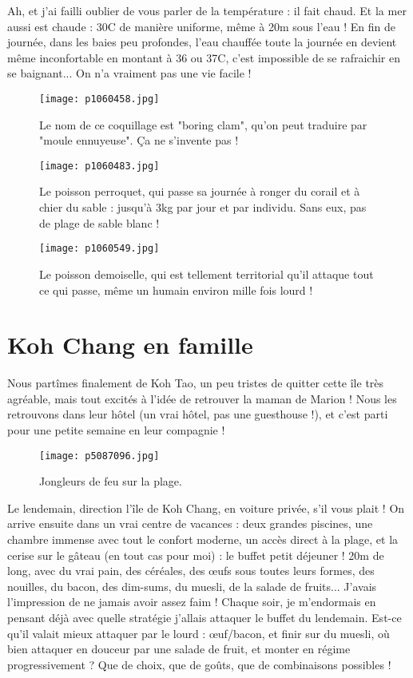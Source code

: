 \documentclass{book}
\begin{document}
Ah, et j'ai failli oublier de vous parler de la température : il fait chaud. Et la mer aussi est chaude : 30\textdegree C de manière uniforme, même à 20m sous l'eau ! En fin de journée, dans les baies peu profondes, l'eau chauffée toute la journée en devient même inconfortable en montant à 36 ou 37\textdegree C, c'est impossible de se rafraichir en se baignant... On n'a vraiment pas une vie facile !


\begin{figure}[h]
\centering
\texttt{[image: p1060458.jpg]}
\caption*{Le nom de ce coquillage est "boring clam", qu'on peut traduire par "moule ennuyeuse". Ça ne s'invente pas !}
\end{figure}


\begin{figure}[h]
\centering
\texttt{[image: p1060483.jpg]}
\caption*{Le poisson perroquet, qui passe sa journée à ronger du corail et à chier du sable : jusqu'à 3kg par jour et par individu. Sans eux, pas de plage de sable blanc !}
\end{figure}


\begin{figure}[h]
\centering
\texttt{[image: p1060549.jpg]}
\caption*{Le poisson demoiselle, qui est tellement territorial qu'il attaque tout ce qui passe, même un humain environ mille fois lourd !}
\end{figure}




\chapter{Koh Chang en famille}
Nous partîmes finalement de Koh Tao, un peu tristes de quitter cette île très agréable, mais tout excités à l'idée de retrouver la maman de Marion ! Nous les retrouvons dans leur hôtel (un vrai hôtel, pas une guesthouse !), et c'est parti pour une petite semaine en leur compagnie !


\begin{figure}[h]
\centering
\texttt{[image: p5087096.jpg]}
\caption*{Jongleurs de feu sur la plage.}
\end{figure}

Le lendemain, direction l'île de Koh Chang, en voiture privée, s'il vous plait ! On arrive ensuite dans un vrai centre de vacances : deux grandes piscines, une chambre immense avec tout le confort moderne, un accès direct à la plage, et la cerise sur le gâteau (en tout cas pour moi) : le buffet petit déjeuner ! 20m de long, avec du vrai pain, des céréales, des œufs sous toutes leurs formes, des nouilles, du bacon, des dim-sums, du muesli, de la salade de fruits... J'avais l'impression de ne jamais avoir assez faim ! Chaque soir, je m'endormais en pensant déjà avec quelle stratégie j'allais attaquer le buffet du lendemain. Est-ce qu'il valait mieux attaquer par le lourd : œuf/bacon, et finir sur du muesli, où bien attaquer en douceur par une salade de fruit, et monter en régime progressivement ? Que de choix, que de goûts, que de combinaisons possibles !
\end{document}
